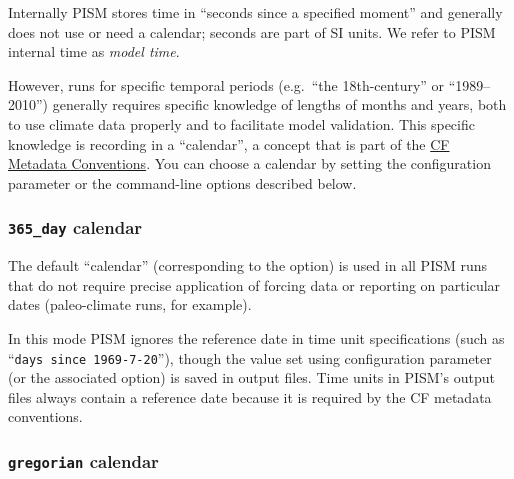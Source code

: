 \documentclass[titlepage,letterpaper,final]{scrartcl}
\begin{document}
Internally PISM stores time in ``seconds since a specified moment'' and
generally does not use or need a calendar; seconds are part of SI units.
We refer to PISM internal time as \emph{model time}.

However, runs for specific temporal periods (e.g.~``the 18th-century'' or
``1989--2010'') generally requires specific knowledge of lengths of months
and years, both to use climate data properly and to facilitate model validation.
This specific knowledge is recording in a ``calendar'', a concept that
is part of the \href{http://cf-pcmdi.llnl.gov/documents/cf-conventions/1.6/cf-conventions.html}{CF Metadata Conventions}.
You can choose a calendar by setting the  configuration
parameter or the command-line options described below.

\subsubsection{\texttt{365_day} calendar}
\label{sec:365-day}

The default ``calendar'' (corresponding to the  option) is used in all PISM runs that do not require precise application of forcing data or reporting on particular dates (paleo-climate runs, for example).

In this mode PISM ignores the reference date in time unit specifications
(such as ``\texttt{days since 1969-7-20}''), though the value set using
 configuration parameter (or the associated option) is saved in
output files.  Time units in PISM's output files always contain a reference date
because it is required by the CF metadata conventions.

\subsubsection{\texttt{gregorian} calendar}
\label{sec:gregorian}
\end{document}
